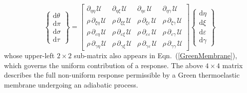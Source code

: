 \begin{equation}
\label{energies2D}
\left\{ \begin{matrix}
\mathrm{d} \theta \\ \mathrm{d} \pi \\
\mathrm{d} \sigma \\ \mathrm{d} \tau
\end{matrix} \right\} = \begin{bmatrix}
\partial_{\eta\eta\,} \mathcal{U} & 
\partial_{\eta\xi\,} \mathcal{U} & 
\partial_{\eta\varepsilon\,} \mathcal{U} & 
\partial_{\eta\gamma\,} \mathcal{U} \\ 
\rho \, \partial_{\xi\eta\,} \mathcal{U} & 
\rho \, \partial_{\xi\xi\,} \mathcal{U} & 
\rho \, \partial_{\xi\varepsilon\,} \mathcal{U} &
\rho \, \partial_{\xi\gamma\,} \mathcal{U} \\
\rho \, \partial_{\varepsilon\eta\,} \mathcal{U} & 
\rho \, \partial_{\varepsilon\xi\,} \mathcal{U} & 
\rho \, \partial_{\varepsilon\varepsilon\,} \mathcal{U} & 
\rho \, \partial_{\varepsilon\gamma\,} \mathcal{U} \\
\rho \, \partial_{\gamma\eta\,} \mathcal{U} & 
\rho \, \partial_{\gamma\xi\,} \mathcal{U} & 
\rho \, \partial_{\gamma\varepsilon\,} \mathcal{U} & 
\rho \, \partial_{\gamma\gamma\,} \mathcal{U} 
\end{bmatrix} 
\left\{ \begin{matrix}
\mathrm{d}\eta \\ \mathrm{d} \xi \\
\mathrm{d} \varepsilon \\ \mathrm{d} \gamma
\end{matrix} \right\}  
\end{equation}
whose upper-left $2\times 2$ sub-matrix also appears in Eqn.~(\ref{GreenMembrane}), which governs the uniform contribution of a response.  The above $4 \times 4$ matrix describes the full non-uniform response permissible by a Green thermo\-elastic membrane undergoing an adiabatic process.

